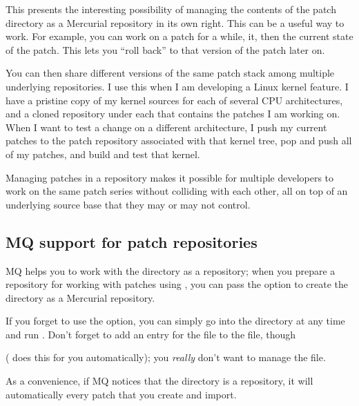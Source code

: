 This presents the interesting possibility of managing the contents of
the patch directory as a Mercurial repository in its own right.  This
can be a useful way to work.  For example, you can work on a patch for
a while,  it, then  the current state of
the patch.  This lets you ``roll back'' to that version of the patch
later on.

You can then share different versions of the same patch stack among
multiple underlying repositories.  I use this when I am developing a
Linux kernel feature.  I have a pristine copy of my kernel sources for
each of several CPU architectures, and a cloned repository under each
that contains the patches I am working on.  When I want to test a
change on a different architecture, I push my current patches to the
patch repository associated with that kernel tree, pop and push all of
my patches, and build and test that kernel.

Managing patches in a repository makes it possible for multiple
developers to work on the same patch series without colliding with
each other, all on top of an underlying source base that they may or
may not control.

\subsection{MQ support for patch repositories}

MQ helps you to work with the  directory as a
repository; when you prepare a repository for working with patches
using , you can pass the  option to
create the  directory as a Mercurial repository.

\begin{note}
  If you forget to use the  option, you can simply go
  into the  directory at any time and run
  .  Don't forget to add an entry for the
   file to the  file, though

  ( does this for you
  automatically); you \emph{really} don't want to manage the
   file.
\end{note}

As a convenience, if MQ notices that the 
directory is a repository, it will automatically  every
patch that you create and import.

